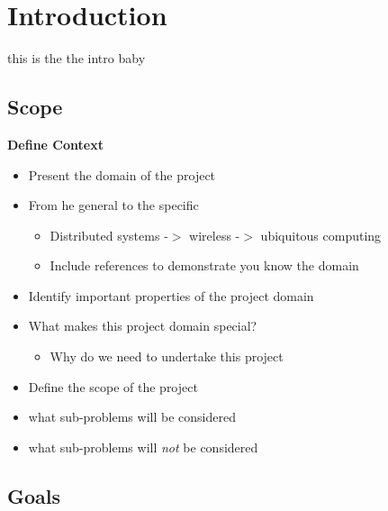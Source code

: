 \def\mytitle{KIIIB}
\def\myauthor{Andreas Moller s042809, David Emil Lemvigh s042809}
\def\affiliation{IMM@DTU}

\chapter{Introduction}
\label{introduction}

this is the the intro baby

\section{Scope}
\label{scope}

\textbf{Define Context}

\begin{itemize}
\item Present the domain of the project

\item From he general to the specific

\begin{itemize}
\item Distributed systems -$>$ wireless -$>$ ubiquitous computing

\item Include references to demonstrate you know the domain

\end{itemize}

\item Identify important properties of the project domain

\item What makes this project domain special?

\begin{itemize}
\item Why do we need to undertake this project

\end{itemize}

\item Define the scope of the project

\item what sub-problems will be considered

\item what sub-problems will \emph{not} be considered

\end{itemize}

\section{Goals}
\label{goals}

